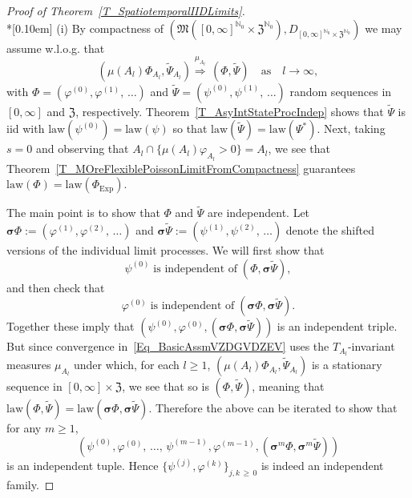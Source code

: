 \documentclass[10pt]{amsart}
\theoremstyle{definition}\newtheorem{defi}[theo]{Definition}\newtheorem{rema}[theo]{Remark}\newtheorem{exam}[theo]{Example}\newtheorem{exem}[theo]{Example}\newtheorem{nota}[theo]{Notation}
\newcommand{\Expl}{\mathrm{Exp}}
\newcommand{\law}{\mathrm{law}}
\newcommand{\bfsig}{\boldsymbol{\sigma}}
\newcommand{\frkZ}{\mathfrak{Z}}
\newcommand{\frkM}{\mathfrak{M}}
\newcommand{\bbN}{\mathbb{N}}
\begin{document}
\begin{proof}[{Proof of Theorem~\ref{T_SpatiotemporalIIDLimits}}]\ \\*[0.10em]
\noindent(i) \label{prooftheo5.3.i} By compactness of $(\frkM([0,\infty]^{\bbN_{0}}\times\frkZ ^{\bbN_{0}}),D_{[0,\infty]^{\bbN_{0}}\times\frkZ ^{\bbN_{0}}})$ we may assume w.l.o.g. that
\begin{equation}\label{Eq_BasicAssmVZDGVDZEV}
\left(\mu(A_{l})\Phi_{A_{l}},\widetilde{\Psi}_{A_{l}}\right)\overset{\mu_{A_{l}} }{\Longrightarrow}\,\left(\Phi,\widetilde{\Psi}\right)\quad\text{as}\quad l\rightarrow
\infty, 
\end{equation}
with $\Phi=(\varphi^{(0)},\varphi^{(1)},\,\ldots)$ and $\widetilde{\Psi} =(\psi^{(0)},\psi^{(1)},\,\ldots)$ random sequences in $[0,\infty]$ and $\frkZ$, respectively. Theorem~\ref{T_AsyIntStateProcIndep} shows that $\widetilde{\Psi}$ is iid with $\law(\psi^{(0)})=\law(\psi)$ so that $\law(\widetilde{\Psi})=\law(\Psi^{\ast})$. Next, taking $s=0$ and observing that $A_{l}\cap\{\mu(A_{l})\varphi_{A_{l} }>0\}=A_{l}$, we see that Theorem~\ref{T_MOreFlexiblePoissonLimitFromCompactness} guarantees $\law (\Phi)=\law(\Phi_{\Expl})$.


The main point is to show that $\Phi$ and $\widetilde{\Psi}$ are independent. Let $\bfsig\Phi:=(\varphi^{(1)},\varphi^{(2)},\,\ldots)$ and $\bfsig\widetilde{\Psi}:=(\psi^{(1)},\psi^{(2)},\,\ldots)$ denote the shifted versions of the individual limit processes. We will first show that
\begin{equation}\label{Eq_TwistIndependence1}
\psi^{(0)}\;\text{is independent of}\;\left(\Phi,\bfsig
\widetilde{\Psi}\right),
\end{equation}
and then check that
\begin{equation}\label{Eq_TwistIndependence2}
\varphi^{(0)}\;\text{is independent of}\;\left(\bfsig
\Phi,\bfsig\widetilde{\Psi}\right).
\end{equation}
Together these imply that $(\psi^{(0)},\varphi^{(0)},(\bfsig
\Phi,\bfsig\widetilde{\Psi}))$ is an independent triple. But since convergence in~\eqref{Eq_BasicAssmVZDGVDZEV} uses the $T_{A_{l}}$-invariant measures $\mu_{A_{l}}$ under which, for each $l\geq1$, $(\mu(A_{l})\Phi _{A_{l}},\widetilde{\Psi}_{A_{l}})$ is a stationary sequence in $[0,\infty]\times\frkZ$, we see that so is $(\Phi,\widetilde{\Psi})$, meaning that $\law(\Phi,\widetilde{\Psi})=\law(\bfsig
\Phi,\bfsig\widetilde{\Psi})$. Therefore the above can be iterated to show that for any $m\geq1$, 
\[
\left(\psi^{(0)},\varphi^{(0)},\,\ldots,\,\psi ^{(m-1)},\varphi^{(m-1)},\left(\bfsig^{m}\Phi,\bfsig ^{m}\widetilde{\Psi}\right)\right)
\]
is an independent tuple. Hence $\{\psi^{(j)},\varphi^{(k)}\}_{j,k\,\geq\,0}$ is indeed an independent family.


\end{proof}
\end{document}

